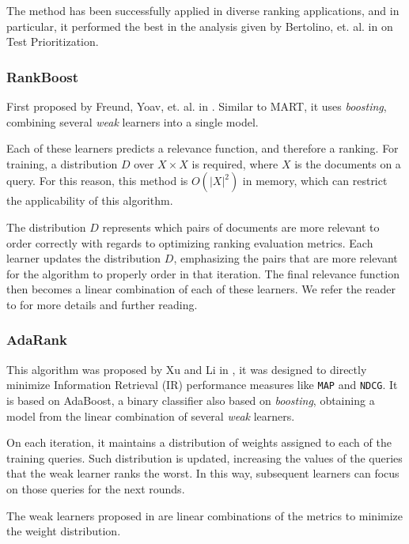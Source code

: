 The method has been successfully applied in diverse ranking applications, and in particular, it performed
the best in the analysis given by Bertolino, et. al. in \cite{Bertolino2020LearningtoRankVR} on Test Prioritization.

\subsubsection{RankBoost}\label{s:bg-tsp-rankboost}

First proposed by Freund, Yoav, et. al. in \cite{10.5555/945365.964285}. Similar to MART, it uses \emph{boosting}, combining
several \emph{weak} learners into a single model.

Each of these learners predicts a relevance function, and therefore a ranking. For training, a distribution $D$ over
$X\times X$ is required, where $X$ is the documents on a query. For this reason, this method is $O(|X|^2)$ in memory, which
can restrict the applicability of this algorithm. 

The distribution $D$ represents which pairs of documents are more relevant to order correctly with regards to
optimizing ranking evaluation metrics. Each learner updates the distribution $D$, emphasizing the pairs that are more relevant for the algorithm
to properly order in that iteration. The final relevance function then becomes a linear combination of each of these learners.
We refer the reader to \cite{10.5555/945365.964285} for more details and further reading.

\subsubsection{AdaRank}
This algorithm was proposed by Xu and Li in \cite{xuliadarank}, it was designed to directly minimize Information Retrieval (IR) performance measures
like \texttt{MAP} and \texttt{NDCG}. It is based on AdaBoost, a binary classifier also based on \emph{boosting},
obtaining a model from the linear combination of several \emph{weak} learners.

On each iteration, it maintains a distribution of weights assigned to each of the training queries.
Such distribution is updated, increasing the values of the queries that the weak learner ranks the worst.
In this way, subsequent learners can focus on those queries for the next rounds.

The weak learners proposed in \cite{xuliadarank} are linear combinations of the metrics to minimize the weight distribution.

